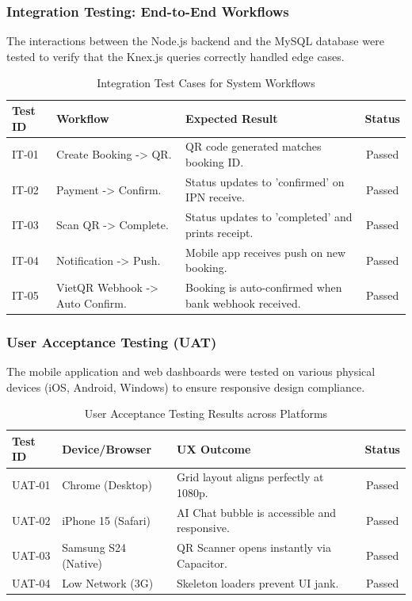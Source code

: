 \subsubsection{Integration Testing: End-to-End Workflows}
The interactions between the Node.js backend and the MySQL database were tested to verify that the Knex.js queries correctly handled edge cases.

\begin{table}[htbp]
\centering
\begin{tabularx}{\textwidth}{|l|X|X|c|}
\hline
\rowcolor{LightCyan}
\textbf{Test ID} & \textbf{Workflow} & \textbf{Expected Result} & \textbf{Status} \\ \hline
IT-01 & Create Booking -> QR. & QR code generated matches booking ID. & Passed \\ \hline
IT-02 & Payment -> Confirm. & Status updates to 'confirmed' on IPN receive. & Passed \\ \hline
IT-03 & Scan QR -> Complete. & Status updates to 'completed' and prints receipt. & Passed \\ \hline
IT-04 & Notification -> Push. & Mobile app receives push on new booking. & Passed \\ \hline
IT-05 & VietQR Webhook -> Auto Confirm. & Booking is auto-confirmed when bank webhook received. & Passed \\ \hline
\end{tabularx}
\caption{Integration Test Cases for System Workflows}
\label{tab:integration_tests}
\end{table}

\subsubsection{User Acceptance Testing (UAT)}
The mobile application and web dashboards were tested on various physical devices (iOS, Android, Windows) to ensure responsive design compliance.

\begin{table}[htbp]
\centering
\begin{tabularx}{\textwidth}{|l|X|X|c|}
\hline
\rowcolor{LightCyan}
\textbf{Test ID} & \textbf{Device/Browser} & \textbf{UX Outcome} & \textbf{Status} \\ \hline
UAT-01 & Chrome (Desktop) & Grid layout aligns perfectly at 1080p. & Passed \\ \hline
UAT-02 & iPhone 15 (Safari) & AI Chat bubble is accessible and responsive. & Passed \\ \hline
UAT-03 & Samsung S24 (Native) & QR Scanner opens instantly via Capacitor. & Passed \\ \hline
UAT-04 & Low Network (3G) & Skeleton loaders prevent UI jank. & Passed \\ \hline
\end{tabularx}
\caption{User Acceptance Testing Results across Platforms}
\end{table}

